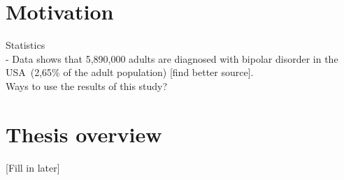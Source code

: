
\section{Motivation}
Statistics\\
- Data shows that 5,890,000 adults are diagnosed with bipolar disorder in the USA (2,65\% of the adult population) [find better source].
\\

\noindent Ways to use the results of this study? 


\section{Thesis overview}  
[Fill in later]